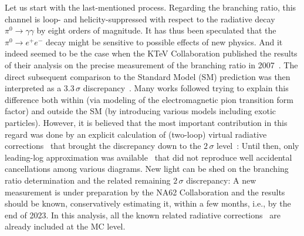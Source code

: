 Let us start with the last-mentioned process.
Regarding the branching ratio, this channel is loop- and helicity-suppressed with respect to the radiative decay $\pi^0\to\gamma\gamma$ by eight orders of magnitude.
It has thus been speculated that the $\pi^0\to e^+e^-$ decay might be sensitive to possible effects of new physics.
And it indeed seemed to be the case when the KTeV Collaboration published the results of their analysis on the precise measurement of the branching ratio in 2007~\cite{KTeV:2006pwx}.
The direct subsequent comparison to the Standard Model (SM) prediction was then interpreted as a 3.3\,$\sigma$ discrepancy~\cite{Dorokhov:2007bd}.
Many works followed trying to explain this difference both within (via modeling of the electromagnetic pion transition form factor) and outside the SM (by introducing various models including exotic particles).
However, it is believed that the most important contribution in this regard was done by an explicit calculation of (two-loop) virtual radiative corrections~\cite{Vasko:2011pi} that brought the discrepancy down to the $2\,\sigma$ level~\cite{Husek:2015wta}: Until then, only leading-log approximation was available~\cite{Bergstrom:1982wk,Dorokhov:2008qn} that did not reproduce well accidental cancellations among various diagrams.
New light can be shed on the branching ratio determination and the related remaining $2\,\sigma$ discrepancy: A new measurement is under preparation by the NA62 Collaboration and the results should be known, conservatively estimating it, within a few months, i.e., by the end of 2023.
In this analysis, all the known related radiative corrections~\cite{Vasko:2011pi,Husek:2014tna,Husek:2015sma,Husek:2018qdx} are already included at the MC level.


